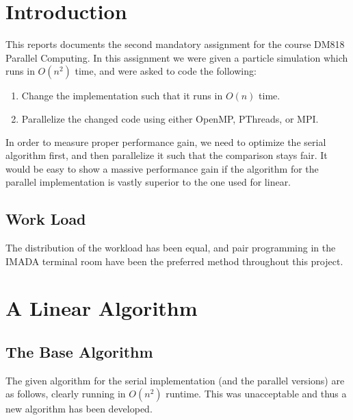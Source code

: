 \documentclass[a4paper,11pt,oneside]{book}
\begin{document}
\pagestyle{ruled}
\chapter{Introduction}
\setcounter{section}{1}

This reports documents the second mandatory assignment for the course DM818 Parallel Computing. In this assignment we
were given a particle simulation which runs in $O(n^{2})$ time, and were asked to code the following:

\begin{enumerate}
\item Change the implementation such that it runs in $O(n)$ time.
\item Parallelize the changed code using either OpenMP, PThreads, or MPI.
\end{enumerate}

In order to measure proper performance gain, we need to optimize the serial algorithm first, and then parallelize it
such that the comparison stays fair. It would be easy to show a massive performance gain if the algorithm for the
parallel implementation is vastly superior to the one used for linear.
 
\section{Work Load}


The distribution of the workload has been equal, and pair programming in the IMADA terminal room have been the preferred
method throughout this project.

\chapter{A Linear Algorithm}


\section{The Base Algorithm}

The given algorithm for the serial implementation (and the parallel versions) are as follows, clearly running in
$O(n^{2})$ runtime. This was unacceptable and thus a new algorithm has been developed.
\end{document}
